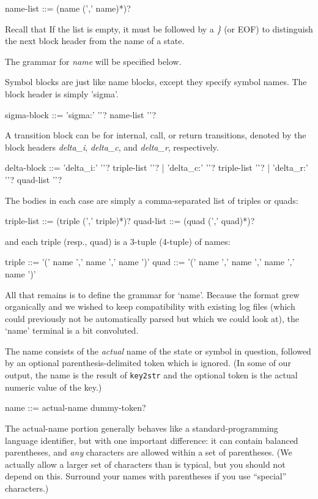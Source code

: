   name-list ::=  (name (','  name)*)?

Recall that If the list is empty, it must be followed by a \textsl{\}}
(or EOF) to distinguish the next block header from the name of a
state.

The grammar for \textsl{name} will be specified below.


Symbol blocks are just like name blocks, except they specify symbol
names. The block header is simply 'sigma'.

  sigma-block  ::=  'sigma:'  '{'?  name-list  '}'?


A transition block can be for internal, call, or return transitions,
denoted by the block headers \textsl{delta\_i}, \textsl{delta\_c}, and
\textsl{delta\_r}, respectively.
 
  delta-block  ::=  'delta_i:'  '{'?  triple-list  '}'?
                 |  'delta_c:'  '{'?  triple-list  '}'?
                 |  'delta_r:'  '{'?  quad-list    '}'?

The bodies in each case are simply a comma-separated list of triples
or quads:

  triple-list ::=  (triple  (','  triple)*)?
  quad-list   ::=  (quad  (','  quad)*)?

and each triple (resp., quad) is a 3-tuple (4-tuple) of names:

  triple  ::=  '('  name ','  name  ','  name  ')'
  quad  ::=  '('  name ','  name  ','  name  ','  name  ')'


All that remains is to define the grammar for `name'. Because the
format grew organically and we wished to keep compatibility with
existing log files (which could previously not be automatically parsed
but which we could look at), the `name' terminal is a bit convoluted.

The name consists of the \textsl{actual} name of the state or symbol
in question, followed by an optional parenthesis-delimited token which
is ignored. (In some of our output, the name is the result of
\texttt{key2str} and the optional token is the actual numeric value of
the key.)

  name  ::=  actual-name  dummy-token?

The actual-name portion generally behaves like a standard-programming
language identifier, but with one important difference: it can contain
balanced parentheses, and \textsl{any} characters are allowed within a
set of parentheses. (We actually allow a larger set of characters than
is typical, but you should not depend on this. Surround your names
with parentheses if you use ``special'' characters.)

